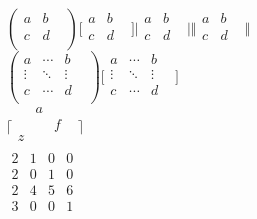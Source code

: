 \documentclass[12pt, a4paper]{article}
\begin{document}
$(\begin{matrix}
a & b & \\
c & d & \\
\end{matrix}
)\lbrack \begin{matrix}
a & b & \\
c & d & \\
\end{matrix}
\rbrack \vert \begin{matrix}
a & b & \\
c & d & \\
\end{matrix}
\vert \Vert \begin{matrix}
a & b & \\
c & d & \\
\end{matrix}
\Vert $\\


$(\begin{matrix}
a & \cdots  & b & \\
\vdots  & \ddots  & \vdots  & \\
c & \cdots  & d & \\
\end{matrix}
)\lbrack \begin{matrix}
a & \cdots  & b & \\
\vdots  & \ddots  & \vdots  & \\
c & \cdots  & d & \\
\end{matrix}
\rbrack $\\


$\lceil \begin{matrix}
 & a &  & \\
 &  & f & \\
z &  &  & \\
\end{matrix}
\rceil $\\


$\begin{matrix}
2 & 1 & 0 & 0 & \\
2 & 0 & 1 & 0 & \\
2 & 4 & 5 & 6 & \\
3 & 0 & 0 & 1 & \\
\end{matrix}
$\\
\end{document}
